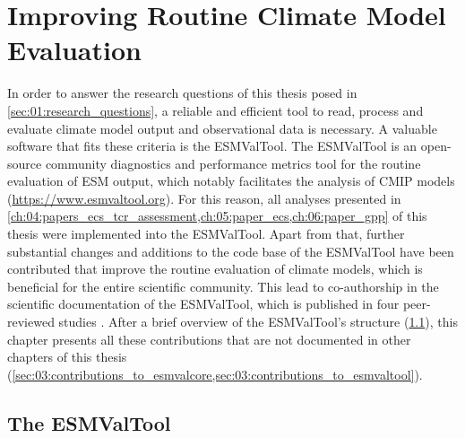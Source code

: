 


\chapter{Improving Routine Climate Model Evaluation}
\label{ch:03:esmvaltool}

In order to answer the research questions of this thesis posed in
\cref{sec:01:research_questions}, a reliable and efficient tool to read,
process and evaluate climate model output and observational data is necessary.
A valuable software that fits these criteria is the \ac{ESMValTool}. The
\ac{ESMValTool} is an open-source community diagnostics and performance metrics
tool for the routine evaluation of \ac{ESM} output, which notably facilitates
the analysis of \ac{CMIP} models (\url{https://www.esmvaltool.org}). For this
reason, all analyses presented in
\cref{ch:04:papers_ecs_tcr_assessment,ch:05:paper_ecs,ch:06:paper_gpp} of this
thesis were implemented into the \ac{ESMValTool}. Apart from that, further
substantial changes and additions to the code base of the \ac{ESMValTool} have
been contributed that improve the routine evaluation of climate models, which
is beneficial for the entire scientific community. This lead to co-authorship
in the scientific documentation of the \ac{ESMValTool}, which is published in
four peer-reviewed studies \autocite{Eyring2020, Lauer2020, Righi2020,
  Weigel2020}. After a brief overview of the \ac{ESMValTool}'s structure
(\cref{sec:03:esmvaltool}), this chapter presents all these contributions that
are not documented in other chapters of this thesis
(\cref{sec:03:contributions_to_esmvalcore,sec:03:contributions_to_esmvaltool}).


\section{The \acf{ESMValTool}}
\label{sec:03:esmvaltool}

